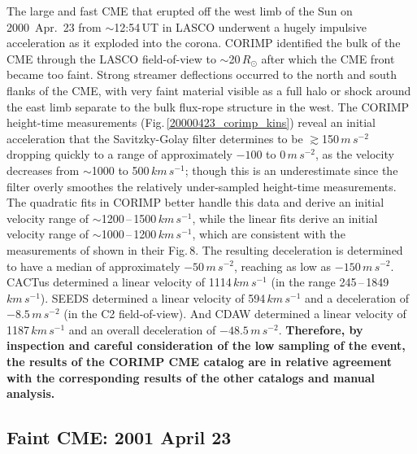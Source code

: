 \documentclass[referee,a4paper,12pt,traditabstract]{swsc}
\begin{document}
\begin{linenumbers}
The large and fast CME that erupted off the west limb of the Sun on 2000~Apr.~23 from $\sim$12:54\,UT in LASCO underwent a hugely impulsive acceleration as it exploded into the corona. CORIMP identified the bulk of the CME through the LASCO field-of-view to $\sim$20\,$R_\odot$ after which the CME front became too faint. Strong streamer deflections occurred to the north and south flanks of the CME, with very faint material visible as a full halo or shock around the east limb separate to the bulk flux-rope structure in the west. The CORIMP height-time measurements (Fig.\,\ref{20000423_corimp_kins}) reveal an initial acceleration that the Savitzky-Golay filter determines to be $\gtrsim$150\,$m\,s^{-2}$ dropping quickly to a range of approximately $-100$ to 0\,$m\,s^{-2}$, as the velocity decreases from $\sim$1000 to 500\,$km\,s^{-1}$; though this is an underestimate since the filter overly smoothes the relatively under-sampled height-time measurements. The quadratic fits in CORIMP better handle this data and derive an initial velocity range of $\sim$1200\,--\,1500\,$km\,s^{-1}$, while the linear fits derive an initial velocity range of $\sim$1000\,--\,1200\,$km\,s^{-1}$, which are consistent with the measurements of \cite{2009A&A...495..325B} shown in their Fig.\,8. The resulting deceleration is determined to have a median of approximately $-50\,m\,s^{-2}$, reaching as low as $-150\,m\,s^{-2}$. CACTus determined a linear velocity of 1114$\,km\,s^{-1}$ (in the range 245\,--\,1849\,$km\,s^{-1}$). SEEDS determined a linear velocity of 594\,$km\,s^{-1}$ and a deceleration of $-8.5\,m\,s^{-2}$ (in the C2 field-of-view). And CDAW determined a linear velocity of 1187$\,km\,s^{-1}$ and an overall deceleration of $-48.5\,m\,s^{-2}$. {\bf Therefore, by inspection and careful consideration of the low sampling of the event, the results of the CORIMP CME catalog are in relative agreement with the corresponding results of the other catalogs and manual analysis.}


\subsection{Faint CME: 2001 April 23}
\label{sect_20010423}



\end{linenumbers}
\end{document}
